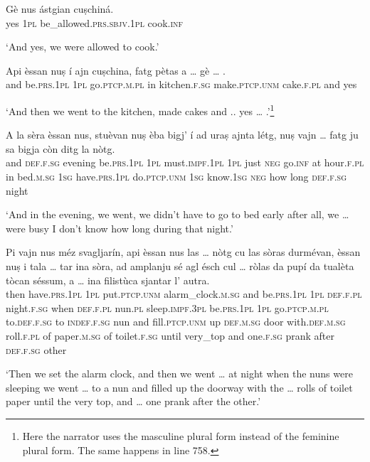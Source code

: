 \begin{linenumbers}
\gll    Gè nus\footnotemark{} ástgian cuṣchiná. \\
yes \textsc{1pl} be\_allowed.\textsc{prs.sbjv.1pl} cook.\textsc{inf}\\
\end{linenumbers}
\medskip
\glt `And yes, we were allowed to cook.'
\medskip

\begin{linenumbers}
\gll Api èssan nuṣ í\footnotemark{} ajn cuṣchina, fatg pètas a … gè … .\\
and be.\textsc{prs.1pl} \textsc{1pl} go.\textsc{ptcp.m.pl} in kitchen.\textsc{f.sg} make.\textsc{ptcp.unm} cake.\textsc{f.pl} and {} yes \\
\end{linenumbers}
\medskip
\glt `And then we went to the kitchen, made cakes and .. yes … .'\footnote{Here the narrator uses the masculine plural form instead of the feminine plural form. The same happens in line 758.}
\medskip

\begin{linenumbers}
\gll    A la sèra èssan nus, stuèvan nuṣ èba bigj’ í ad uraṣ ajnta létg, nuṣ vajn … fatg ju sa bigja còn  ditg la nòtg.\\
and \textsc{def.f.sg} evening be.\textsc{prs.1pl} \textsc{1pl} must.\textsc{impf.1pl} \textsc{1pl} just \textsc{neg} go.\textsc{inf} at hour.\textsc{f.pl} in  bed.\textsc{m.sg} \textsc{1sg} have.\textsc{prs.1pl} {} do.\textsc{ptcp.unm} \textsc{1sg} know.\textsc{1sg} \textsc{neg} how long \textsc{def.f.sg} night\\
\end{linenumbers}
\medskip
\glt `And in the evening, we went, we didn’t have to go to bed early after all, we … were busy I don’t know how long during that night.'
\medskip

\begin{linenumbers}
\gll Pi vajn nus méz svagljarín, api èssan nus las … nòtg cu las sòras durmévan, èssan nuṣ i\footnotemark{} tala … tar ina sòra, ad amplanju sé agl ésch cul … ròlas da pupí da tualèta tòcan séssum, a … ina filistùca sjantar l’ autra.\\
then have.\textsc{prs.1pl} \textsc{1pl} put.\textsc{ptcp.unm} alarm\_clock.\textsc{m.sg} and be.\textsc{prs.1pl} \textsc{1pl} \textsc{def.f.pl} {} night.\textsc{f.sg} when \textsc{def.f.pl} nun.\textsc{pl} sleep.\textsc{impf.3pl} be.\textsc{prs.1pl} \textsc{1pl} go.\textsc{ptcp.m.pl} to.\textsc{def.f.sg} {} to \textsc{indef.f.sg} nun and fill.\textsc{ptcp.unm} up \textsc{def.m.sg} door with.\textsc{def.m.sg} {} roll.\textsc{f.pl} of paper.\textsc{m.sg} of toilet.\textsc{f.sg} until very\_top and {} one.\textsc{f.sg} prank after \textsc{def.f.sg} other\\
\end{linenumbers}
\medskip
\glt `Then we set the alarm clock, and then we went … at night when the nuns were sleeping we went … to a nun and filled up the doorway with the … rolls of toilet paper until the very top, and … one prank after the other.'
\medskip

